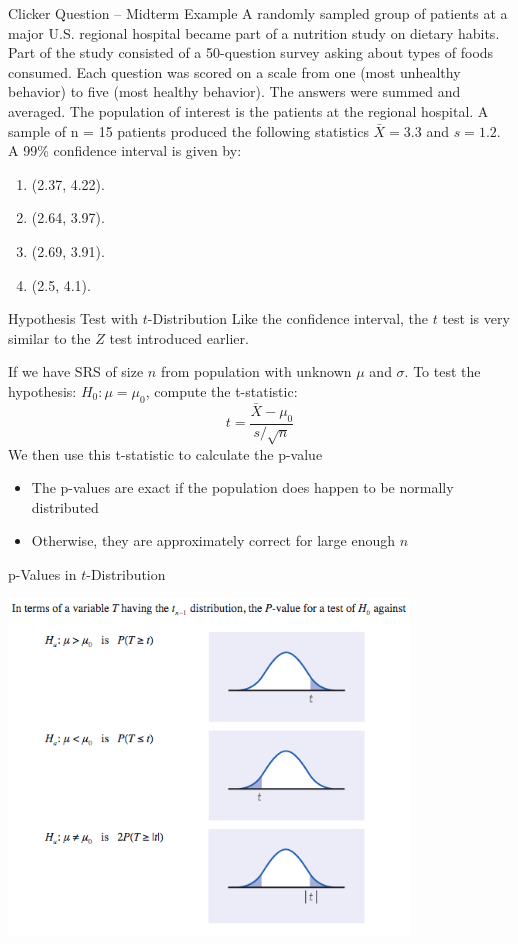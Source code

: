 \documentclass{beamer}
\begin{document}
\begin{frame}{Clicker Question -- Midterm Example}
	A randomly sampled group of patients at a major U.S. regional hospital became part of a nutrition study on dietary habits. Part of the study consisted of a 50-question survey asking about types of foods consumed. Each question was scored on a scale from one (most unhealthy behavior) to five (most healthy behavior). The answers were summed and averaged. The population of interest is the patients at the regional hospital. A sample of n = 15 patients produced the following statistics $\bar{X}=3.3$ and $s=1.2$. A 99\% confidence interval is given by:

	\begin{enumerate}[label=(\alph*)]
		\item (2.37, 4.22). %
		\item (2.64, 3.97).
		\item (2.69, 3.91).
		\item (2.5, 4.1).
	\end{enumerate}
\end{frame}



\begin{frame}{Hypothesis Test with $t$-Distribution}
	Like the confidence interval, the $t$ test is very similar to the $Z$ test introduced earlier.
	
	If we have  SRS of size $n$ from population with unknown $\mu$ and $\sigma$. To test the hypothesis: $H_0: \mu = \mu_0$, compute the \alert{t-statistic}:
	$$t=\frac{\bar{X}-\mu_0}{s/\sqrt{n}}$$
	We then use this t-statistic to calculate the p-value
	\begin{itemize}
		\item The p-values are exact if the population does happen to be normally distributed
		\item Otherwise, they are approximately correct for large enough $n$
	\end{itemize}
\end{frame}


\begin{frame}{p-Values in $t$-Distribution}
	\begin{center}
		\includegraphics[width=0.8\textwidth]{pvalues_t}
	\end{center}
\end{frame}
\end{document}
